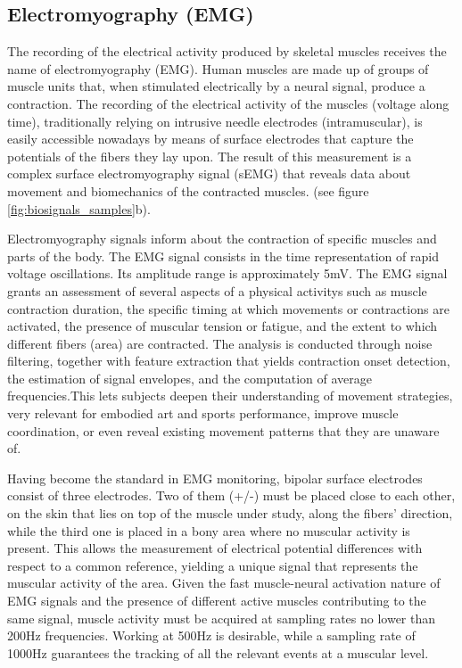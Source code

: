 \subsection*{Electromyography (EMG)}
The recording of the electrical activity produced by skeletal muscles receives the name of electromyography (EMG). Human muscles are made up of groups of muscle units that, when stimulated electrically by a neural signal, produce a contraction. The recording of the electrical activity of the muscles (voltage along time), traditionally relying on intrusive needle electrodes (intramuscular), is easily accessible nowadays by means of surface electrodes that capture the potentials of the fibers they lay upon. The result of this measurement is a complex surface electromyography signal (sEMG) that reveals data about movement and biomechanics of the contracted muscles.
(see figure \ref{fig:biosignals_samples}b).

Electromyography signals inform about the contraction of specific muscles and parts of the body. The EMG signal consists in the time representation of rapid voltage oscillations. Its amplitude range is approximately 5mV. The EMG signal grants an assessment of several aspects of a physical activitys such as muscle contraction duration, the specific timing at which movements or contractions are activated, the presence of muscular tension or fatigue, and the extent to which different fibers (area) are contracted. The analysis is conducted through noise filtering, together with feature extraction that yields contraction onset detection, the estimation of signal envelopes, and the computation of average frequencies.This lets subjects deepen their understanding of movement strategies, very relevant for embodied art and sports performance, improve muscle coordination, or even reveal existing movement patterns that they are unaware of.

Having become the standard in EMG monitoring, bipolar surface electrodes consist of three electrodes. Two of them (+/-) must be placed close to each other, on the skin that lies on top of the muscle under study, along the fibers' direction, while the third one is placed in a bony area where no muscular activity is present. This allows the measurement of electrical potential differences with respect to a common reference, yielding a unique signal that represents the muscular activity of the area. Given the fast muscle-neural activation nature of EMG signals and the presence of different active muscles contributing to the same signal, muscle activity must be acquired at sampling rates no lower than 200Hz frequencies. Working at 500Hz is desirable, while a sampling rate of 1000Hz guarantees the tracking of all the relevant events at a muscular level.

